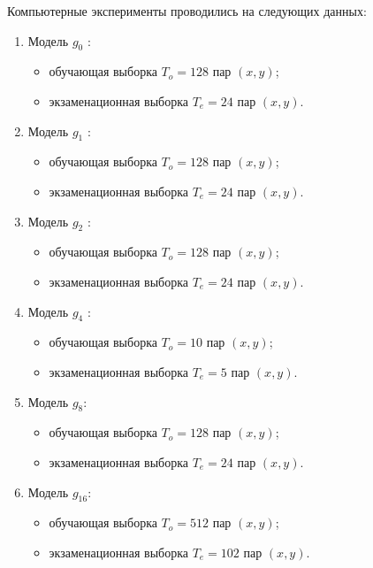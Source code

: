 Компьютерные эксперименты проводились на следующих данных:
\begin{enumerate}
	\item Модель $g_0$ :
	\begin{itemize}
		\item обучающая выборка $T_o=128$ пар $(x, y)$;
		\item экзаменационная выборка $T_e=24$ пар $(x, y)$.
	\end{itemize}
	
	\item Модель $g_1$ :
	\begin{itemize}
		\item обучающая выборка $T_o=128$ пар $(x, y)$;
		\item экзаменационная выборка $T_e=24$ пар $(x, y)$.
	\end{itemize}
	
	\item Модель $g_2$ :
	\begin{itemize}
		\item обучающая выборка $T_o=128$ пар $(x, y)$;
		\item экзаменационная выборка $T_e=24$ пар $(x, y)$.
	\end{itemize}

	
	\item Модель $g_4$ :
	\begin{itemize}
		\item обучающая выборка $T_o=10$ пар $(x, y)$;
		\item экзаменационная выборка $T_e=5$ пар $(x, y)$.
	\end{itemize}
	
	\item Модель $g_8$:
	\begin{itemize}
		\item обучающая выборка $T_o=128$ пар $(x, y)$;
		\item экзаменационная выборка $T_e=24$ пар $(x, y)$.
	\end{itemize}
	
	\item Модель $g_{16}$:
	\begin{itemize}
		\item обучающая выборка $T_o=512$ пар $(x, y)$;
		\item экзаменационная выборка $T_e=102$ пар $(x, y)$.
	\end{itemize}
	

\end{enumerate}

